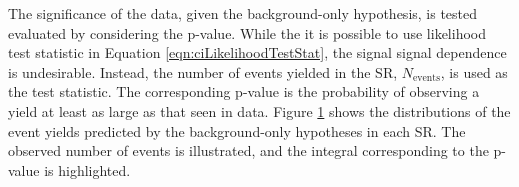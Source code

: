 \begin{figure}[h!]
\captionsetup[subfigure]{position=b}
\centering
{}
\caption{}
\label{fig:ciSignificance}
\end{figure}

The significance of the data, given the background-only hypothesis, is tested evaluated by considering the p-value.
While the it is possible to use likelihood test statistic in Equation \ref{eqn:ciLikelihoodTestStat}, the signal signal dependence is undesirable.
Instead, the number of events yielded in the SR, $N_\text{events}$, is used as the test statistic.
The corresponding p-value is the probability of observing a yield at least as large as that seen in data.
Figure \ref{fig:ciSignificance} shows the distributions of the event yields predicted by the background-only hypotheses in each SR.
The observed number of events is illustrated, and the integral corresponding to the p-value is highlighted.

